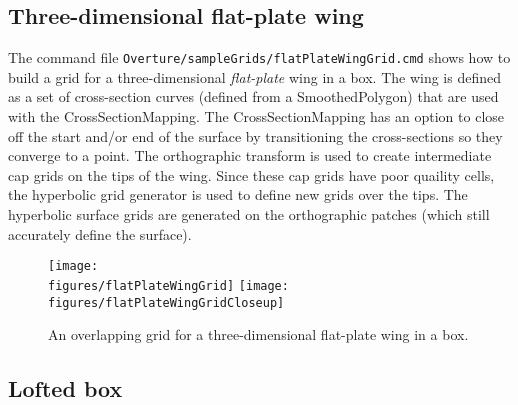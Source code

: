\documentclass[xcolor=rgb,svgnames,dvipsnames]{article}
\newcommand{\figures}{../fig}
\begin{document}


\clearpage
\subsection{Three-dimensional flat-plate wing}\label{sec:FlatPlateWing}

The command file {\tt Overture/sampleGrids/flatPlateWingGrid.cmd} shows how to build a grid 
for a three-dimensional {\em flat-plate} wing in a box. The wing is defined as a set of 
cross-section curves (defined from a SmoothedPolygon)
that are used with the CrossSectionMapping. The CrossSectionMapping has an option to 
close off the start and/or end of the surface by transitioning the cross-sections
so they converge to a point. The orthographic transform is used to create intermediate cap grids on
the tips of the wing. Since these cap grids have poor quaility cells, the hyperbolic grid generator
is used to define new grids over the tips. The hyperbolic surface grids are generated on the orthographic patches (which still
accurately define the surface).

\begin{figure}[htb]
  \begin{center}
   \texttt{[image: \\figures/flatPlateWingGrid]}
   \texttt{[image: \\figures/flatPlateWingGridCloseup]}
  \caption{An overlapping grid for a three-dimensional flat-plate wing in a box. } \label{fig:flatPlateWingGrid}
  \end{center}
\end{figure}


\subsection{Lofted box}\label{sec:LoftedBox}
\end{document}

